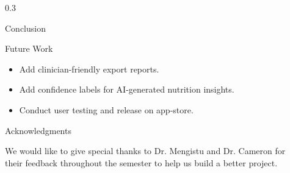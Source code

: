 \documentclass[final]{beamer}
\newlength{\sepwidth}
\newcommand{\separatorcolumn}{\begin{column}{\sepwidth}\end{column}}
\begin{document}
\begin{frame}[t]
\begin{columns}[t]
\begin{column}{0.3\paperwidth}
\begin{block}{Conclusion}
  \end{block}

  \begin{block}{Future Work}

    \begin{itemize}
      \item Add clinician-friendly export reports.
      \item Add confidence labels for AI-generated nutrition insights.
      \item Conduct user testing and release on app-store.
    \end{itemize}

  \end{block}

  \begin{block}{Acknowledgments}

    We would like to give special thanks to Dr. Mengistu  and Dr. Cameron for their feedback throughout the semester to help us build a better project.



  \end{block}

\end{column}

\separatorcolumn
\end{columns}
\end{frame}
\end{document}
